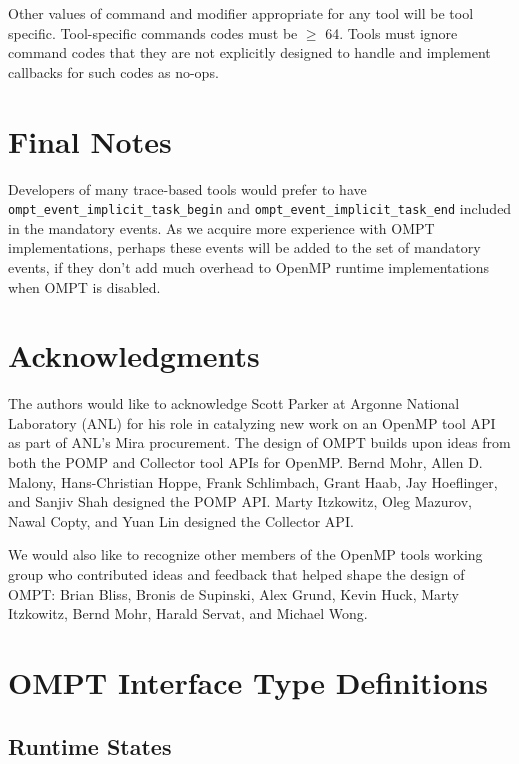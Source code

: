 \documentclass{article}
\begin{document}
{Other values of command  and modifier appropriate for any tool will be tool specific. Tool-specific commands codes must be $\geq$ 64. Tools must ignore command codes that they are not explicitly designed to handle and implement callbacks for such codes as no-ops.


\section{Final Notes}
\label{sec:notes}
Developers of many trace-based tools would prefer to have  \verb|ompt_event_implicit_task_begin| and \verb|ompt_event_implicit_task_end| included in the mandatory events. As we acquire more experience with OMPT implementations, perhaps these events will be added to the set of mandatory events, if they don't add much overhead to OpenMP runtime implementations when OMPT is disabled.

\section*{Acknowledgments}

The authors would like to acknowledge Scott Parker at Argonne National Laboratory (ANL) for 
his role in catalyzing new work on an OpenMP tool API as part of ANL's Mira procurement.
The design of OMPT builds upon ideas from both the POMP and Collector tool APIs for OpenMP. 
Bernd Mohr, Allen D. Malony, Hans-Christian Hoppe, Frank Schlimbach, 
Grant Haab, Jay Hoeflinger, and Sanjiv Shah designed the POMP API. 
Marty Itzkowitz, Oleg Mazurov, Nawal Copty, and Yuan Lin designed the Collector API.

We would also like to recognize other members of the OpenMP tools working group who contributed ideas and feedback that helped shape the design of  OMPT: Brian Bliss, Bronis de Supinski, Alex Grund, Kevin Huck, Marty Itzkowitz, Bernd Mohr, Harald Servat, and Michael Wong.

 \clearpage
 
 


\appendix
\clearpage


\section{OMPT Interface Type Definitions}
\label{appendix:ompt-types}
\subsection{Runtime States}
\label{appendix:ompt-types:states}

}
\end{document}
